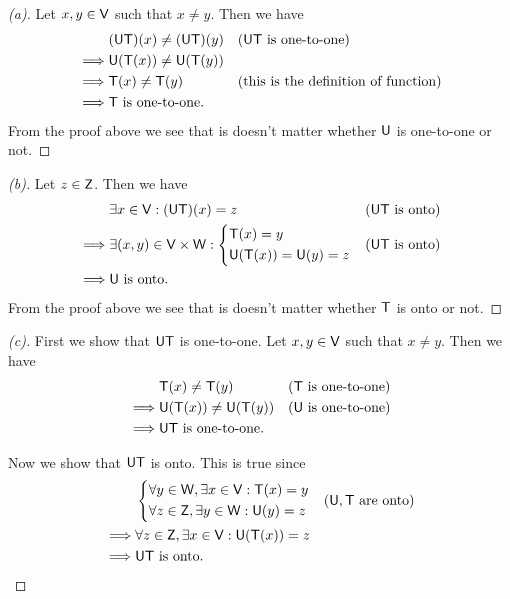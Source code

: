 \begin{proof}[(a)]
  Let \(x, y \in \mathsf{V}\) such that \(x \neq y\).
  Then we have
  \begin{align*}
             & (\mathsf{U} \mathsf{T})(x) \neq (\mathsf{U} \mathsf{T})(y) &  & \text{(\(\mathsf{U}\mathsf{T}\) is one-to-one)}            \\
    \implies & \mathsf{U}(\mathsf{T}(x)) \neq \mathsf{U}(\mathsf{T}(y))                                                    \\
    \implies & \mathsf{T}(x) \neq \mathsf{T}(y)           &  & \text{(this is the definition of function)} \\
    \implies & \mathsf{T} \text{ is one-to-one}.
  \end{align*}
  From the proof above we see that is doesn't matter whether \(\mathsf{U}\) is one-to-one or not.
\end{proof}

\begin{proof}[(b)]
  Let \(z \in \mathsf{Z}\).
  Then we have
  \begin{align*}
             & \exists x \in \mathsf{V} : (\mathsf{U} \mathsf{T})(x) = z                &  & \text{(\(\mathsf{U}\mathsf{T}\) is onto)} \\
    \implies & \exists (x, y) \in \mathsf{V} \times \mathsf{W} : \begin{dcases}
                                                   \mathsf{T}(x) = y \\
                                                   \mathsf{U}(\mathsf{T}(x)) = \mathsf{U}(y) = z
                                                 \end{dcases} &  & \text{(\(\mathsf{U}\mathsf{T}\) is onto)}   \\
    \implies & \mathsf{U} \text{ is onto}.
  \end{align*}
  From the proof above we see that is doesn't matter whether \(\mathsf{T}\) is onto or not.
\end{proof}

\begin{proof}[(c)]
  First we show that \(\mathsf{U} \mathsf{T}\) is one-to-one.
  Let \(x, y \in \mathsf{V}\) such that \(x \neq y\).
  Then we have
  \begin{align*}
             & \mathsf{T}(x) \neq \mathsf{T}(y)             &  & \text{(\(\mathsf{T}\) is one-to-one)} \\
    \implies & \mathsf{U}(\mathsf{T}(x)) \neq \mathsf{U}(\mathsf{T}(y))     &  & \text{(\(\mathsf{U}\) is one-to-one)} \\
    \implies & \mathsf{U} \mathsf{T} \text{ is one-to-one}.
  \end{align*}

  Now we show that \(\mathsf{U} \mathsf{T}\) is onto.
  This is true since
  \begin{align*}
             & \begin{dcases}
                 \forall y \in \mathsf{W}, \exists x \in \mathsf{V} : \mathsf{T}(x) = y \\
                 \forall z \in \mathsf{Z}, \exists y \in \mathsf{W} : \mathsf{U}(y) = z
               \end{dcases}     &  & \text{(\(\mathsf{U}, \mathsf{T}\) are onto)}     \\
    \implies & \forall z \in \mathsf{Z}, \exists x \in \mathsf{V} : \mathsf{U}(\mathsf{T}(x)) = z \\
    \implies & \mathsf{U} \mathsf{T} \text{ is onto}.
  \end{align*}
\end{proof}

